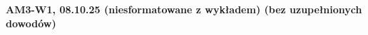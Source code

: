\documentclass[10pt,a4paper]{article}
\newcommand{\zagadnienie}[3]{%
    \clearpage %
    \noindent\textbf{#1} #2\\
    #3
}
\begin{document}
\zagadnienie{AM3-W1, 08.10.25 (niesformatowane z wykładem) (bez uzupełnionych dowodów)}{}
{
}
\end{document}
